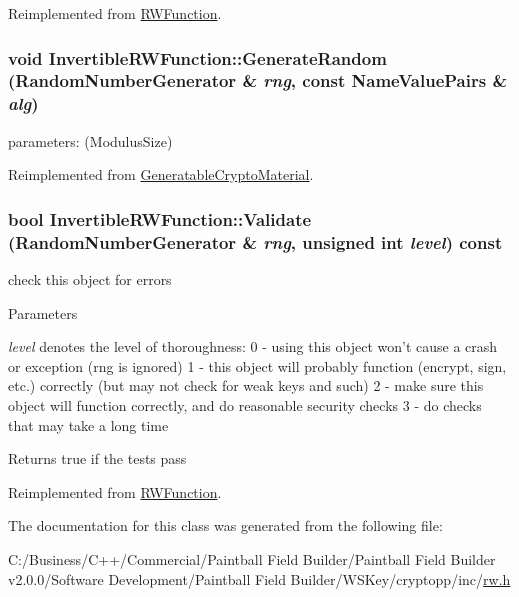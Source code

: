 Reimplemented from \hyperlink{class_r_w_function_a99293c55c055b338bd7c783a7b8c0484}{RWFunction}.\hypertarget{class_invertible_r_w_function_a8953bb59727e0ae2d79071874a793c48}{
\subsubsection[{GenerateRandom}]{\setlength{\rightskip}{0pt plus 5cm}void InvertibleRWFunction::GenerateRandom ({\bf RandomNumberGenerator} \& {\em rng}, \/  const {\bf NameValuePairs} \& {\em alg})}}
\label{class_invertible_r_w_function_a8953bb59727e0ae2d79071874a793c48}
parameters: (ModulusSize) 

Reimplemented from \hyperlink{class_generatable_crypto_material_abe368b52db1ca7079b690f2d6e605f7a}{GeneratableCryptoMaterial}.\hypertarget{class_invertible_r_w_function_a7f5052834d9716bfc3a5585c6addbd46}{
\subsubsection[{Validate}]{\setlength{\rightskip}{0pt plus 5cm}bool InvertibleRWFunction::Validate ({\bf RandomNumberGenerator} \& {\em rng}, \/  unsigned int {\em level}) const}}
\label{class_invertible_r_w_function_a7f5052834d9716bfc3a5585c6addbd46}


check this object for errors 
\begin{DoxyParams}{Parameters}
\item[{\em level}]denotes the level of thoroughness: 0 -\/ using this object won't cause a crash or exception (rng is ignored) 1 -\/ this object will probably function (encrypt, sign, etc.) correctly (but may not check for weak keys and such) 2 -\/ make sure this object will function correctly, and do reasonable security checks 3 -\/ do checks that may take a long time \end{DoxyParams}
\begin{DoxyReturn}{Returns}
true if the tests pass 
\end{DoxyReturn}


Reimplemented from \hyperlink{class_r_w_function_a6280452ff21d540667c6b3f08faba0c9}{RWFunction}.

The documentation for this class was generated from the following file:\begin{DoxyCompactItemize}
\item 
C:/Business/C++/Commercial/Paintball Field Builder/Paintball Field Builder v2.0.0/Software Development/Paintball Field Builder/WSKey/cryptopp/inc/\hyperlink{rw_8h}{rw.h}\end{DoxyCompactItemize}
